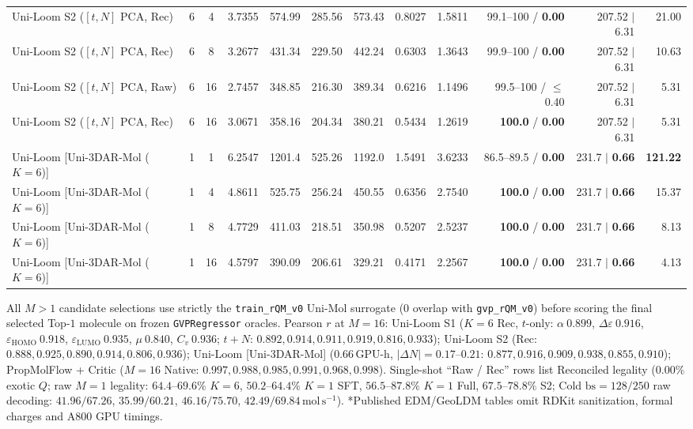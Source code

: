 \documentclass[11pt,a4paper]{article}
\begin{document}
\begin{table}[!h]
{\begin{tabular}{@{}lccrrrrrrrrr@{}}
    Uni-Loom S2 ($[t,N]$ PCA, Rec) & 6 & 4 & 3.7355 & 574.99 & 285.56 & 573.43 & 0.8027 & 1.5811 & 99.1--100 / \textbf{0.00} & 207.52 $\mid$ 6.31 & 21.00 \\
    Uni-Loom S2 ($[t,N]$ PCA, Rec) & 6 & 8 & 3.2677 & 431.34 & 229.50 & 442.24 & 0.6303 & 1.3643 & 99.9--100 / \textbf{0.00} & 207.52 $\mid$ 6.31 & 10.63 \\
    Uni-Loom S2 ($[t,N]$ PCA, Raw) & 6 & 16 & 2.7457 & 348.85 & 216.30 & 389.34 & 0.6216 & 1.1496 & 99.5--100 / $\le$0.40 & 207.52 $\mid$ 6.31 & 5.31 \\
    Uni-Loom S2 ($[t,N]$ PCA, Rec) & 6 & 16 & 3.0671 & 358.16 & 204.34 & 380.21 & 0.5434 & 1.2619 & \textbf{100.0} / \textbf{0.00} & 207.52 $\mid$ 6.31 & 5.31 \\
    \midrule
    Uni-Loom [Uni-3DAR-Mol ($K=6$)] & 1 & 1 & 6.2547 & 1201.4 & 525.26 & 1192.0 & 1.5491 & 3.6233 & 86.5--89.5 / \textbf{0.00} & 231.7 $\mid$ \textbf{0.66} & \textbf{121.22} \\
    Uni-Loom [Uni-3DAR-Mol ($K=6$)] & 1 & 4 & 4.8611 & 525.75 & 256.24 & 450.55 & 0.6356 & 2.7540 & \textbf{100.0} / \textbf{0.00} & 231.7 $\mid$ \textbf{0.66} & 15.37 \\
    Uni-Loom [Uni-3DAR-Mol ($K=6$)] & 1 & 8 & 4.7729 & 411.03 & 218.51 & 350.98 & 0.5207 & 2.5237 & \textbf{100.0} / \textbf{0.00} & 231.7 $\mid$ \textbf{0.66} & 8.13 \\
    Uni-Loom [Uni-3DAR-Mol ($K=6$)] & 1 & 16 & 4.5797 & 390.09 & 206.61 & 329.21 & 0.4171 & 2.2567 & \textbf{100.0} / \textbf{0.00} & 231.7 $\mid$ \textbf{0.66} & 4.13 \\
    \bottomrule
  \end{tabular}%
  }
  \vspace{2pt}\par{\scriptsize
  All $M>1$ candidate selections use strictly the \texttt{train\_rQM\_v0} Uni-Mol surrogate ($0$ overlap with \texttt{gvp\_rQM\_v0}) before scoring the final selected Top-$1$ molecule on frozen \texttt{GVPRegressor} oracles. Pearson $r$ at $M=16$: Uni-Loom S1 ($K=6$ Rec, $t$-only: $\alpha\ 0.899$, $\Delta\varepsilon\ 0.916$, $\varepsilon_{\text{HOMO}}\ 0.918$, $\varepsilon_{\text{LUMO}}\ 0.935$, $\mu\ 0.840$, $C_v\ 0.936$; $t+N$: $0.892, 0.914, 0.911, 0.919, 0.816, 0.933$); Uni-Loom S2 (Rec: $0.888, 0.925, 0.890, 0.914, 0.806, 0.936$); Uni-Loom [Uni-3DAR-Mol] ($0.66\,\text{GPU-h}$, $|\Delta N|=0.17\text{--}0.21$: $0.877, 0.916, 0.909, 0.938, 0.855, 0.910$); PropMolFlow + Critic ($M=16$ Native: $0.997, 0.988, 0.985, 0.991, 0.968, 0.998$). Single-shot ``Raw / Rec'' rows list Reconciled legality ($0.00\%$ exotic $Q$; raw $M=1$ legality: $64.4\text{--}69.6\%$ $K=6$, $50.2\text{--}64.4\%$ $K=1$ SFT, $56.5\text{--}87.8\%$ $K=1$ Full, $67.5\text{--}78.8\%$ S2; Cold $\text{bs}=128/250$ raw decoding: $41.96/67.26$, $35.99/60.21$, $46.16/75.70$, $42.49/69.84\,\text{mol}\,\text{s}^{-1}$). *Published EDM/GeoLDM tables omit RDKit sanitization, formal charges and A800 GPU timings.}
\end{table}
\end{document}
